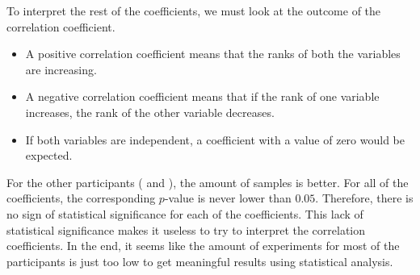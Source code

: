 \begin{figure}[H]
{		\label{fig:user3}
	}
	\hspace{0.5cm}
	\label{fig:Walking Test Visualization}
\end{figure}
\newpage
%
To interpret the rest of the coefficients, we must look at the outcome of the correlation coefficient.
%
\begin{itemize}
	\item A positive correlation coefficient means that the ranks of both the variables are increasing.
	\item A negative correlation coefficient means that if the rank of one variable increases, the rank of the other variable decreases. 
	\item If both variables are independent, a coefficient with a value of zero would be expected.
\end{itemize}
%
For the other participants ( and ), the amount of samples is better.
For all of the coefficients, the corresponding $p$-value is never lower than $0.05$.
Therefore, there is no sign of statistical significance for each of the coefficients.
This lack of statistical significance makes it useless to try to interpret the correlation coefficients.
In the end, it seems like the amount of experiments for most of the participants is just too low to get meaningful results using statistical analysis.